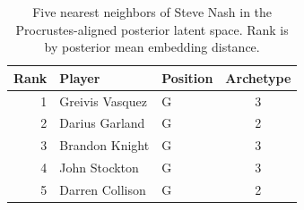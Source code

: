 \begin{table}[htbp]
  \centering\small
  \begin{tabular}{rllc}
    \toprule
    Rank & Player & Position & Archetype \\
    \midrule
    1 & Greivis Vasquez & G & 3 \\
    2 & Darius Garland & G & 2 \\
    3 & Brandon Knight & G & 3 \\
    4 & John Stockton & G & 3 \\
    5 & Darren Collison & G & 2 \\
    \bottomrule
  \end{tabular}
  \caption{Five nearest neighbors of Steve Nash in the Procrustes-aligned posterior latent space. Rank is by posterior mean embedding distance.}
  \label{tab:Steve_Nash_neighbors}
\end{table}

